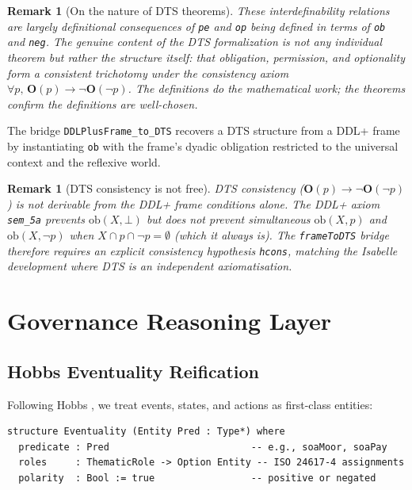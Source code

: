\documentclass[]{article}
\newtheorem{remark}[theorem]{Remark}
\newcommand{\code}[1]{\texttt{#1}}
\newcommand{\OB}{\ensuremath{\mathbf{O}}}
\newcommand{\DDL}{\textup{DDL+}}
\newcommand{\DTS}{\textup{DTS}}
\begin{document}
\begin{remark}[On the nature of DTS theorems]
These interdefinability relations are largely definitional consequences of
\code{pe} and \code{op} being defined in terms of \code{ob} and \code{neg}.
The genuine content of the \DTS{} formalization is not any individual theorem
but rather the \emph{structure} itself: that obligation, permission, and
optionality form a consistent trichotomy under the consistency axiom
$\forall p,\, \OB(p) \to \neg \OB(\neg p)$.
The definitions do the mathematical work; the theorems confirm the
definitions are well-chosen.
\end{remark}

\noindent
The bridge \code{DDLPlusFrame\_to\_DTS} recovers a \DTS{} structure from a
\DDL{} frame by instantiating \code{ob} with the frame's dyadic obligation
restricted to the universal context and the reflexive world.

\begin{remark}[DTS consistency is not free]
\DTS{} consistency ($\OB(p) \to \neg\OB(\neg p)$) is \emph{not} derivable
from the \DDL{} frame conditions alone.  The \DDL{} axiom \code{sem\_5a}
prevents $\text{ob}(X, \bot)$ but does \emph{not} prevent simultaneous
$\text{ob}(X, p)$ and $\text{ob}(X, \neg p)$ when $X \cap p \cap \neg p = \emptyset$
(which it always is).  The \code{frameToDTS} bridge therefore requires an
explicit consistency hypothesis \code{hcons}, matching the Isabelle development
where \DTS{} is an independent axiomatisation.
\end{remark}

\section{Governance Reasoning Layer}
\label{sec:govlayer}

\subsection{Hobbs Eventuality Reification}

Following Hobbs \cite{Hobbs1985}, we treat events, states, and actions as
first-class entities:

\begin{lstlisting}
structure Eventuality (Entity Pred : Type*) where
  predicate : Pred                         -- e.g., soaMoor, soaPay
  roles     : ThematicRole -> Option Entity -- ISO 24617-4 assignments
  polarity  : Bool := true                 -- positive or negated
\end{lstlisting}
\end{document}

